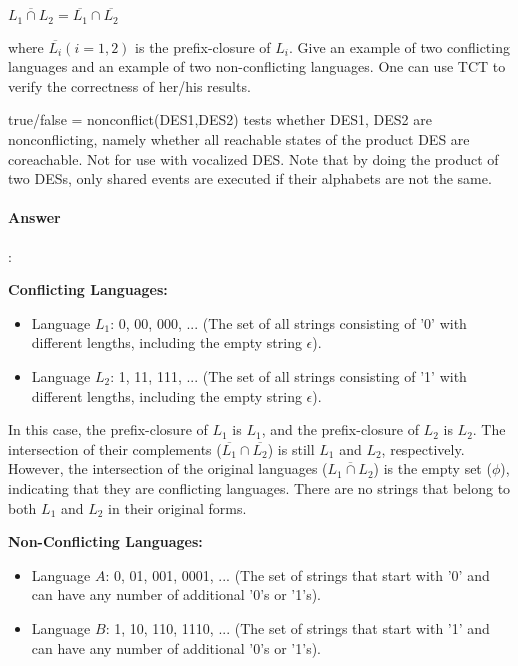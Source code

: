 \documentclass{article}
\begin{document}
$\overline{L_1 \cap L_2} = \overline{L_1} \cap \overline{L_2} $

where $\overline{L_i} (i = 1, 2)$ is the prefix-closure of $L_i$. Give an example of two conflicting languages and an example of two non-conflicting languages. One can use TCT to verify the correctness of her/his results.

\begin{tcolorbox}
  true/false = nonconflict(DES1,DES2) tests whether DES1, DES2 are nonconflicting, namely whether all reachable states of the product DES are coreachable. Not for use with vocalized DES. Note that by doing the product of two DESs, only shared events are executed if their alphabets are not the same.
\end{tcolorbox}

\paragraph{Answer}:

\textbf{Conflicting Languages:}

\begin{itemize}
  \item Language $L_1$: {0, 00, 000, ...} (The set of all strings consisting of '0' with different lengths, including the empty string $\epsilon$).
  \item Language $L_2$: {1, 11, 111, ...} (The set of all strings consisting of '1' with different lengths, including the empty string $\epsilon$).
\end{itemize}

In this case, the prefix-closure of $L_1$ is $L_1$, and the prefix-closure of $L_2$ is $L_2$. The intersection of their complements ($\overline{L_1} \cap \overline{L_2}$) is still $L_1$ and $L_2$, respectively. However, the intersection of the original languages ($\overline{L_1 \cap L_2}$) is the empty set ($\phi $), indicating that they are conflicting languages. There are no strings that belong to both $L_1$ and $L_2$ in their original forms.

\textbf{Non-Conflicting Languages:}

\begin{itemize}
  \item Language $A$: {0, 01, 001, 0001, ...} (The set of strings that start with '0' and can have any number of additional '0's or '1's).
  \item Language $B$: {1, 10, 110, 1110, ...} (The set of strings that start with '1' and can have any number of additional '0's or '1's).
\end{itemize}
\end{document}
